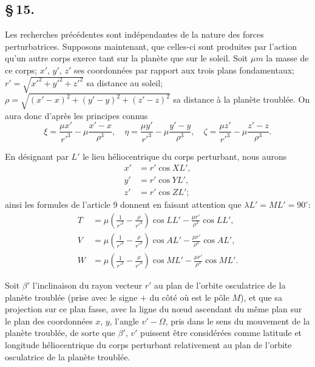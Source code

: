 \documentclass[12pt,a4paper]{article}
\begin{document}
\newpage
\subsection*{\S\,15.}

Les recherches pr\'{e}c\'{e}dentes sont ind\'{e}pendantes de la nature des forces perturbatrices. Supposons maintenant, que celles-ci sont produites par l'action qu'un autre corps exerce tant sur la plan\`{e}te que sur le soleil. Soit $\mu m$ la masse de ce corps; $x'$, $y'$, $z'$ ses coordonn\'{e}es par rapport aux trois plans fondamentaux; $r' = \sqrt{x'^2 + y'^2 + z'^2}$ sa distance au soleil; $\rho = \sqrt{(x'-x)^2 + (y'-y)^2 + (z'-z)^2}$ sa distance \`{a} la plan\`{e}te troubl\'{e}e. On aura donc d'apr\`{e}s les principes connus
\begin{equation}
\xi = \frac{\mu x'}{r'^3} - \mu\frac{x'-x}{\rho^3}, \quad \eta = \frac{\mu y'}{r'^3} - \mu\frac{y'-y}{\rho^3}, \quad \zeta = \frac{\mu z'}{r'^3} - \mu\frac{z'-z}{\rho^3}. \tag{80}
\end{equation}

En d\'{e}signant par $L'$ le lieu h\'{e}liocentrique du corps perturbant, nous aurons
\begin{align}
x' &= r'\cos XL', \tag{81} \\
y' &= r'\cos YL', \tag{82} \\
z' &= r'\cos ZL'; \tag{83}
\end{align}
ainsi les formules de l'article 9 donnent en faisant attention que $\lambda L' = ML' = 90^\circ$:
\begin{align}
T &= \mu\left(\frac{1}{r'^2} - \frac{\rho}{r'^3}\right)\cos LL' - \frac{\mu r'}{\rho^3}\cos LL', \tag{84} \\
V &= \mu\left(\frac{1}{r'^2} - \frac{\rho}{r'^3}\right)\cos AL' - \frac{\mu r'}{\rho^3}\cos AL', \tag{85} \\
W &= \mu\left(\frac{1}{r'^2} - \frac{\rho}{r'^3}\right)\cos ML' - \frac{\mu r'}{\rho^3}\cos ML'. \tag{86}
\end{align}

Soit $\beta'$ l'inclinaison du rayon vecteur $r'$ au plan de l'orbite osculatrice de la plan\`{e}te troubl\'{e}e (prise avec le signe $+$ du c\^{o}t\'{e} o\`{u} est le p\^{o}le $M$), et que sa projection sur ce plan fasse, avec la ligne du n\oe ud ascendant du m\^{e}me plan sur le plan des coordonn\'{e}es $x$, $y$, l'angle $v' - \Omega$, pris dans le sens du mouvement de la plan\`{e}te troubl\'{e}e, de sorte que $\beta'$, $v'$ puissent \^{e}tre consid\'{e}r\'{e}es comme latitude et longitude h\'{e}liocentrique du corps perturbant relativement au plan de l'orbite osculatrice de la plan\`{e}te troubl\'{e}e.
\end{document}
